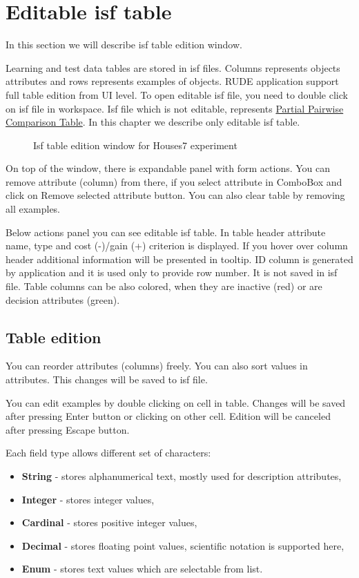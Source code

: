 \section{Editable isf table}\label{section:isf-table}

In this section we will describe isf table edition window.

Learning and test data tables are stored in isf files. Columns represents objects attributes and rows represents examples of objects. RUDE application support full table edition from UI level. To open editable isf file, you need to double click on isf file in workspace. Isf file which is not editable, represents \hyperref[sub:pct-isf]{Partial Pairwise Comparison Table}. In this chapter we describe only editable isf table.

\begin{figure*}[!ht] 
	\centering
	\caption{Isf table edition window for Houses7 experiment}
\end{figure*}

On top of the window, there is expandable panel with form actions.
You can remove attribute (column) from there, if you select attribute in ComboBox and click on Remove selected attribute button. You can also clear table by removing all examples.

Below actions panel you can see editable isf table. In table header attribute name, type and cost (-)/gain (+) criterion is displayed. If you hover over column header additional information will be presented in tooltip. ID column is generated by application and it is used only to provide row number. It is not saved in isf file. Table columns can be also colored, when they are inactive (red) or are decision attributes (green).

\subsection{Table edition}\label{sub:isf-examples}

You can reorder attributes (columns) freely. You can also sort values in attributes. This changes will be saved to isf file.

You can edit examples by double clicking on cell in table. Changes will be saved after pressing Enter button or clicking on other cell. Edition will be canceled after pressing Escape button.

Each field type allows different set of characters:
\begin{itemize}
	\item \textbf{String} - stores alphanumerical text, mostly used for description attributes,
	\item \textbf{Integer} - stores integer values,
	\item \textbf{Cardinal} - stores positive integer values,
	\item \textbf{Decimal} - stores floating point values, scientific notation is supported here,
	\item \textbf{Enum} - stores text values which are selectable from list.
\end{itemize}

